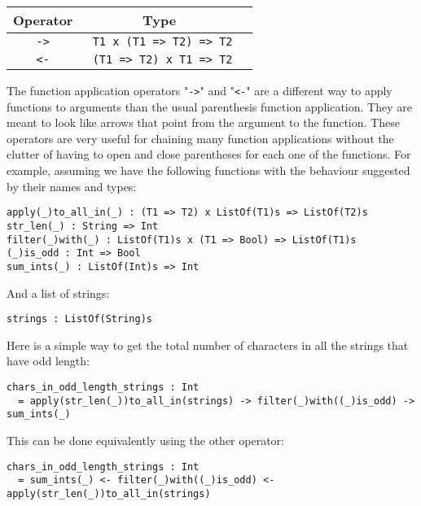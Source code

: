 \documentclass{article}
\begin{document}
\begin{center}
\begin{tabular}{ |c|c|c| }
\hline
Operator & Type
\\
\hline
\hline
\verb|->| & \verb| T1 x (T1 => T2) => T2|
\\
\hline
\verb|<-| & \verb| (T1 => T2) x T1 => T2|
\\
\hline
\end{tabular}
\end{center}
The function application operators "\verb|->|" and "\verb|<-|" are a
different way to apply functions to arguments than the usual parenthesis
function application.  They are meant to look like arrows that point from the
argument to the function.  These operators are very useful for chaining many
function applications without the clutter of having to open and close
parentheses for each one of the functions.  For example, assuming we have the
following functions with the behaviour suggested by their names and types:
\begin{verbatim}
apply(_)to_all_in(_) : (T1 => T2) x ListOf(T1)s => ListOf(T2)s
str_len(_) : String => Int
filter(_)with(_) : ListOf(T1)s x (T1 => Bool) => ListOf(T1)s
(_)is_odd : Int => Bool
sum_ints(_) : ListOf(Int)s => Int
\end{verbatim}
And a list of strings:
\begin{verbatim}
strings : ListOf(String)s
\end{verbatim}
Here is a simple way to get the total number of characters in all the strings
that have odd length:
\begin{verbatim}
chars_in_odd_length_strings : Int
  = apply(str_len(_))to_all_in(strings) -> filter(_)with((_)is_odd) -> sum_ints(_)
\end{verbatim}
This can be done equivalently using the other operator:
\begin{verbatim}
chars_in_odd_length_strings : Int
  = sum_ints(_) <- filter(_)with((_)is_odd) <- apply(str_len(_))to_all_in(strings)

\end{verbatim}

\newpage
\end{document}
